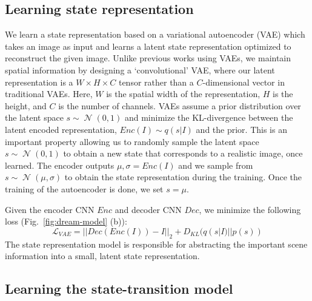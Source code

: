 \documentclass[letterpaper, 10 pt, conference]{ieeeconf}
\newcommand{\mryoo}[1]{\fxnote{\hl{Michael: #1}}}
\DeclareMathOperator{\N}{\mathcal{N}}
\begin{document}
\subsection{Learning state representation}


We learn a state representation based on a variational autoencoder (VAE) \cite{kingma2014auto}
which takes an image as input and learns a latent state representation optimized to reconstruct the given image. Unlike previous works using VAEs, we maintain spatial information by designing a `convolutional' VAE, where our latent representation is a $W\times H\times C$ tensor rather than a $C$-dimensional vector in traditional VAEs. Here, $W$ is the spatial width of the representation, $H$ is the height, and $C$ is the number of channels. VAEs assume a prior distribution over the latent space $s \sim \N(0,1)$ and minimize the KL-divergence between the latent encoded representation, $Enc(I) \sim q(s|I)$ and the prior. This is an important property allowing us to randomly sample the latent space $s\sim \N(0,1)$ to obtain a new state that corresponds to a realistic image, once learned. The encoder outputs $\mu,\sigma = Enc(I)$ and we sample from $s\sim\N (\mu,\sigma)$ to obtain the state representation during the training. Once the training of the autoencoder is done, we set $s=\mu$.

Given the encoder CNN $Enc$ and decoder CNN $Dec$, we minimize the following loss (Fig.~\ref{fig:dream-model} (b)):
\begin{equation}
    \label{eq:vae}
    \mathcal{L}_{VAE} = ||Dec(Enc(I)) - I||_2 + D_{KL}(q(s|I)||p(s))
\end{equation}
The state representation model is responsible for abstracting the important scene information into a small, latent state representation. 

\subsection{Learning the state-transition model}
\end{document}
